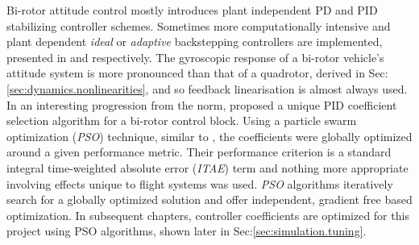 Bi-rotor attitude control mostly introduces plant independent PD \cite{obliquepitch} and PID \cite{tiltrotorUAV} stabilizing controller schemes. Sometimes more computationally intensive and plant dependent \emph{ideal} or \emph{adaptive} backstepping controllers are implemented, presented in \cite{smalltwotilting,tpheonix} and \cite{adaptivebackstep} respectively. The gyroscopic response of a bi-rotor vehicle's attitude system is more pronounced than that of a quadrotor, derived in Sec:\ref{sec:dynamics.nonlinearities}, and so feedback linearisation is almost always used. In an interesting progression from the norm, \cite{autopilotPSO} proposed a unique PID coefficient selection algorithm for a bi-rotor control block. Using a particle swarm optimization (\emph{PSO}) technique, similar to \cite{adaptivepso}, the coefficients were globally optimized around a given performance metric. Their performance criterion is a standard integral time-weighted absolute error (\emph{ITAE}) term and nothing more appropriate involving effects unique to flight systems was used. \emph{PSO} algorithms iteratively search for a globally optimized solution and offer independent, gradient free based optimization. In subsequent chapters, controller coefficients are optimized for this project using PSO algorithms, shown later in Sec:\ref{sec:simulation.tuning}.
\par
